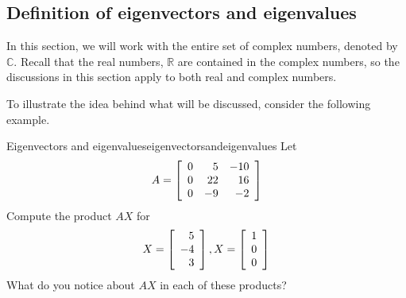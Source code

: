 \subsection{Definition of eigenvectors and eigenvalues}

In this section, we will work with the entire set of complex numbers, 
denoted by $\mathbb{C}$. Recall that the real numbers, $\mathbb{R}$ are 
contained in the complex numbers, so the discussions in this section 
apply to both real and complex numbers. 

To illustrate the idea behind what will be discussed, consider the following
example.

\begin{example}{Eigenvectors and eigenvalues}{eigenvectorsandeigenvalues}
Let
\begin{equation*}
A = \left[
\begin{array}{rrr}
0 & 5 & -10 \\
0 & 22 & 16 \\
0 & -9 & -2
\end{array}
\right] 
\end{equation*}
Compute the product $AX$ for 
\begin{equation*}
X = \left[
\begin{array}{r}
5 \\
-4 \\
 3
\end{array}
\right], X = \left[
\begin{array}{r}
1 \\
0 \\
0
\end{array}
\right]
\end{equation*}
What do you notice about $AX$ in each of these products? 
\end{example}

